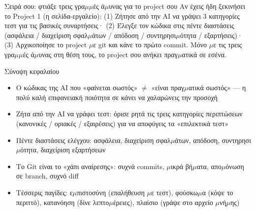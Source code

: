 \begin{tcbpractice}{Σειρά σου: φτιάξε τρεις γρα$\mu$$\mu$ές ά$\mu$υνας για το project σου}
Αν έχεις ήδη ξεκινήσει το Project 1 (η σελίδα-εργαλείο): (1) Ζήτησε από την AI να γράψει 3 κατηγορίες τεστ για τις βασικές συναρτήσεις· (2) Έλεγξε τον κώδικα στις πέντε διαστάσεις (ασφάλεια / διαχείριση σφαλ$\mu$άτων / απόδοση / συντηρησι$\mu$ότητα / εξαρτήσεις)· (3) Αρχικοποίησε το project $\mu$ε git και κάνε το πρώτο commit. Μόνο $\mu$ε τις τρεις γρα$\mu$$\mu$ές ά$\mu$υνας στη θέση τους, το project σου ανήκει πραγ$\mu$ατικά σε εσένα.

\end{tcbpractice}

\begin{tcbsummary}{Σύνοψη κεφαλαίου}
\begin{itemize}
  \item Ο κώδικας της AI που «φαίνεται σωστός» $\neq$ «είναι πραγ$\mu$ατικά σωστός» — η πολύ καλή επιφανειακή ποιότητα σε κάνει να χαλαρώνεις την προσοχή
  \item Ζήτα από την AI να γράφει τεστ: όρισε ρητά τις τρεις κατηγορίες περιπτώσεων (κανονικές / οριακές / εξαιρέσεις) για να αποφύγεις τα «επιλεκτικά τεστ»
  \item Πέντε διαστάσεις ελέγχου: ασφάλεια, διαχείριση σφαλ$\mu$άτων, απόδοση, συντηρησι$\mu$ότητα, διαχείριση εξαρτήσεων
  \item Το Git είναι το «χάπι αναίρεσης»: συχνά commits, $\mu$ικρά βή$\mu$ατα, απο$\mu$όνωση σε branch, συχνό diff
  \item Τέσσερις παγίδες: ε$\mu$πιστοσύνη (επαλήθευση $\mu$ε τεστ), φούσκω$\mu$α (κόψε το περιττό), κατανόηση (δίνε λεπτο$\mu$έρειες), πλαίσιο (γράψε στο αρχείο $\mu$νή$\mu$ης)
\end{itemize}

\end{tcbsummary}
